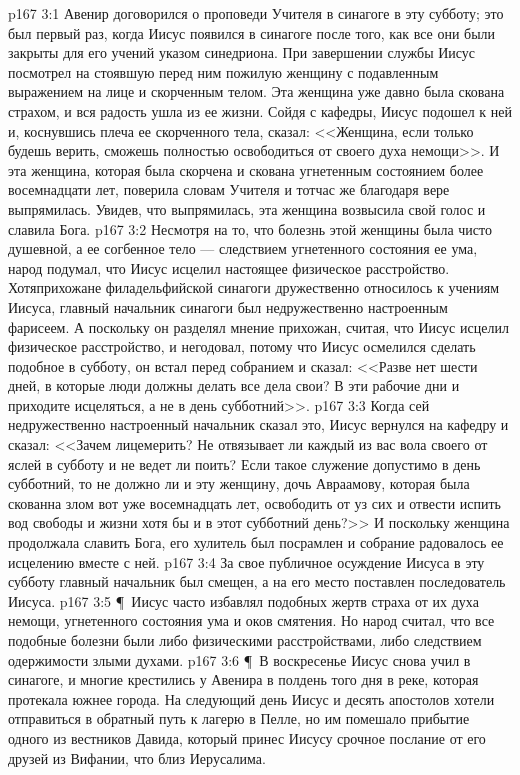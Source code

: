 \vs p167 3:1 Авенир договорился о проповеди Учителя в синагоге в эту субботу; это был первый раз, когда Иисус появился в синагоге после того, как все они были закрыты для его учений указом синедриона. При завершении службы Иисус посмотрел на стоявшую перед ним пожилую женщину с подавленным выражением на лице и скорченным телом. Эта женщина уже давно была скована страхом, и вся радость ушла из ее жизни. Сойдя с кафедры, Иисус подошел к ней и, коснувшись плеча ее скорченного тела, сказал: <<Женщина, если только будешь верить, сможешь полностью освободиться от своего духа немощи>>. И эта женщина, которая была скорчена и скована угнетенным состоянием более восемнадцати лет, поверила словам Учителя и тотчас же благодаря вере выпрямилась. Увидев, что выпрямилась, эта женщина возвысила свой голос и славила Бога.
\vs p167 3:2 Несмотря на то, что болезнь этой женщины была чисто душевной, а ее согбенное тело --- следствием угнетенного состояния ее ума, народ подумал, что Иисус исцелил настоящее физическое расстройство. Хотяприхожане филадельфийской синагоги дружественно относилось к учениям Иисуса, главный начальник синагоги был недружественно настроенным фарисеем. А поскольку он разделял мнение прихожан, считая, что Иисус исцелил физическое расстройство, и негодовал, потому что Иисус осмелился сделать подобное в субботу, он встал перед собранием и сказал: <<Разве нет шести дней, в которые люди должны делать все дела свои? В эти рабочие дни и приходите исцеляться, а не в день субботний>>.
\vs p167 3:3 Когда сей недружественно настроенный начальник сказал это, Иисус вернулся на кафедру и сказал: <<Зачем лицемерить? Не отвязывает ли каждый из вас вола своего от яслей в субботу и не ведет ли поить? Если такое служение допустимо в день субботний, то не должно ли и эту женщину, дочь Авраамову, которая была скованна злом вот уже восемнадцать лет, освободить от уз сих и отвести испить вод свободы и жизни хотя бы и в этот субботний день?>> И поскольку женщина продолжала славить Бога, его хулитель был посрамлен и собрание радовалось ее исцелению вместе с ней.
\vs p167 3:4 За свое публичное осуждение Иисуса в эту субботу главный начальник был смещен, а на его место поставлен последователь Иисуса.
\vs p167 3:5 \P\ Иисус часто избавлял подобных жертв страха от их духа немощи, угнетенного состояния ума и оков смятения. Но народ считал, что все подобные болезни были либо физическими расстройствами, либо следствием одержимости злыми духами.
\vs p167 3:6 \P\ В воскресенье Иисус снова учил в синагоге, и многие крестились у Авенира в полдень того дня в реке, которая протекала южнее города. На следующий день Иисус и десять апостолов хотели отправиться в обратный путь к лагерю в Пелле, но им помешало прибытие одного из вестников Давида, который принес Иисусу срочное послание от его друзей из Вифании, что близ Иерусалима.
